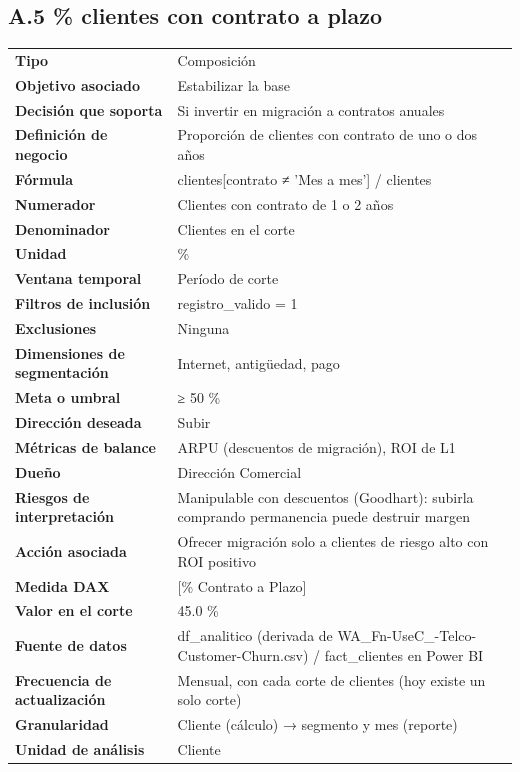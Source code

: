 \subsection*{A.5 \% clientes con contrato a plazo}
\begin{footnotesize}
\begin{longtable}{@{}p{}p{}@{}}
\toprule
\textbf{Tipo} & Composición \\
\textbf{Objetivo asociado} & Estabilizar la base \\
\textbf{Decisión que soporta} & Si invertir en migración a contratos anuales \\
\textbf{Definición de negocio} & Proporción de clientes con contrato de uno o dos años \\
\textbf{Fórmula} & clientes[contrato ≠ 'Mes a mes'] / clientes \\
\textbf{Numerador} & Clientes con contrato de 1 o 2 años \\
\textbf{Denominador} & Clientes en el corte \\
\textbf{Unidad} & \% \\
\textbf{Ventana temporal} & Período de corte \\
\textbf{Filtros de inclusión} & registro\_valido = 1 \\
\textbf{Exclusiones} & Ninguna \\
\textbf{Dimensiones de segmentación} & Internet, antigüedad, pago \\
\textbf{Meta o umbral} & ≥ 50 \% \\
\textbf{Dirección deseada} & Subir \\
\textbf{Métricas de balance} & ARPU (descuentos de migración), ROI de L1 \\
\textbf{Dueño} & Dirección Comercial \\
\textbf{Riesgos de interpretación} & Manipulable con descuentos (Goodhart): subirla comprando permanencia puede destruir margen \\
\textbf{Acción asociada} & Ofrecer migración solo a clientes de riesgo alto con ROI positivo \\
\textbf{Medida DAX} & [\% Contrato a Plazo] \\
\textbf{Valor en el corte} & 45.0 \% \\
\textbf{Fuente de datos} & df\_analitico (derivada de WA\_Fn-UseC\_-Telco-Customer-Churn.csv) / fact\_clientes en Power BI \\
\textbf{Frecuencia de actualización} & Mensual, con cada corte de clientes (hoy existe un solo corte) \\
\textbf{Granularidad} & Cliente (cálculo) → segmento y mes (reporte) \\
\textbf{Unidad de análisis} & Cliente \\
\bottomrule
\end{longtable}
\end{footnotesize}

